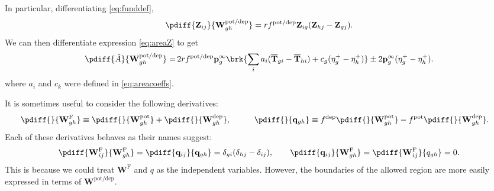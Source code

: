 \documentclass{article} %
\newcommand{\pr}{\mathbf{p}}
\newcommand{\eq}{\pr^\infty}
\newcommand{\fpt}{\mathbf{T}}
\newcommand{\fptb}{\overline{\fpt}}
\newcommand{\fund}{\mathbf{Z}}
\newcommand{\pib}{\boldsymbol{\pi}}
\newcommand{\w}{\mathbf{w}}
\newcommand{\W}{\mathbf{W}}
\newcommand{\enc}{\mathbf{q}}
\newcommand{\frg}{\W^{\mathrm{F}}}
\newcommand{\pot}{^{\text{pot}}}
\newcommand{\dep}{^{\text{dep}}}
\newcommand{\potdep}{^{\text{pot/dep}}}
\begin{document}
In particular, differentiating \eqref{eq:funddef},
%
\begin{equation}\label{eq:derivZ}
  \pdiff{\fund_{ij}}{\W\potdep _{gh}} = rf\potdep  \fund_{ig} (\fund_{hj}-\fund_{gj}).
\end{equation}
%
We can then differentiate expression \eqref{eq:areaZ} to get
%
\begin{equation}\label{eq:derivA}
  \begin{aligned}
    \pdiff{\hat{A}}{\W\potdep _{gh}} =&\,
      2rf\potdep  \eq_g \brk{\sum_i a_i (\fptb_{gi}-\fptb_{hi}) + c_g (\eta^+_{g}-\eta^+_{h})}
      \pm 2 \eq_g (\eta^+_g - \eta^+_h). \\
  \end{aligned}
\end{equation}
%
where $a_i$ and $c_k$ were defined in \eqref{eq:areacoeffs}.

It is sometimes useful to consider the following derivatives:
%
\begin{equation}\label{eq:derivqw}
  \begin{aligned}
    \pdiff{}{\frg_{gh}} &\equiv     \pdiff{}{\W\pot _{gh}} +     \pdiff{}{\W\dep _{gh}} ,&\qquad
    \pdiff{}{\enc_{gh}}    &\equiv f\dep  \pdiff{}{\W\pot _{gh}} - f\pot  \pdiff{}{\W\dep _{gh}} .
  \end{aligned}
\end{equation}
%
Each of these derivatives behaves as their names suggest:
%
\begin{equation}\label{eq:derivqweff}
  \pdiff{\frg_{ij}}{\frg_{gh}} = \pdiff{\enc_{ij}}{\enc_{gh}}
  =  \delta_{gi}(\delta_{hj}-\delta_{ij}),
  \qquad
  \pdiff{\enc_{ij}}{\frg_{gh}} = \pdiff{\frg_{ij}}{q_{gh}}  = 0.
\end{equation}
%
This is because we could treat $\frg$ and $q$ as the independent variables. However, the boundaries of the allowed region are more easily expressed in terms of $\W\potdep $.
\end{document}
